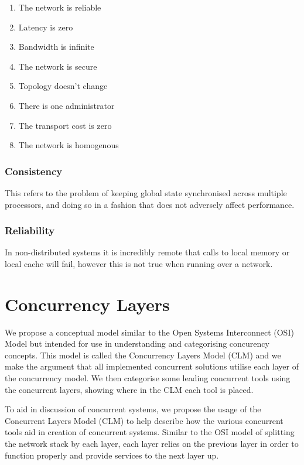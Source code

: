 \documentclass{sig-alternate}
\begin{document}
\begin{enumerate}
\item The network is reliable
\item Latency is zero
\item Bandwidth is infinite
\item The network is secure
\item Topology doesn't change
\item There is one administrator
\item The transport cost is zero
\item The network is homogenous
\end{enumerate}

\subsubsection{Consistency}
This refers to the problem of keeping global state synchronised across multiple processors, and doing so in a fashion that does not adversely affect performance.

\subsubsection{Reliability}
In non-distributed systems it is incredibly remote that calls to local memory or local cache will fail, however this is not true when running over a network. 

\section{Concurrency Layers}
We propose a conceptual model similar to the Open Systems Interconnect (OSI) Model but intended for use in understanding and categorising concurency concepts. This model is called the Concurrency Layers Model (CLM) and we make the argument that all implemented concurrent solutions utilise each layer of the concurrency model. We then categorise some leading concurrent tools using the concurrent layers, showing where in the CLM each tool is placed.

To aid in discussion of concurrent systems, we propose the usage of the Concurrent Layers Model (CLM) to help describe how the various concurrent tools aid in creation of concurrent systems. Similar to the OSI model of splitting the network stack by each layer, each layer relies on the previous layer in order to function properly and provide services to the next layer up.
\end{document}
